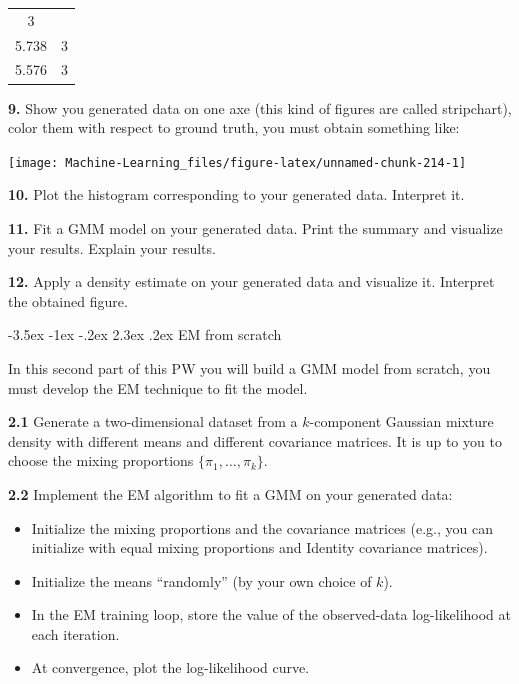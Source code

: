 \documentclass[]{book}
\makeatletter
\providecommand{\tightlist}{%
  \setlength{\itemsep}{0pt}\setlength{\parskip}{0pt}}
\renewcommand\section{\@startsection {section}{1}{\z@}%
                                   {-3.5ex \@plus -1ex \@minus -.2ex}%
                                   {2.3ex \@plus.2ex}%
                                   {\normalfont\Large\bfseries\color{ForestGreen}}}
\theoremstyle{definition}
\theoremstyle{definition}
\theoremstyle{definition}
\theoremstyle{remark}
\makeatother
\begin{document}
\begin{longtable}[]{@{}cc@{}}
\begin{minipage}[t]{0.13\columnwidth}
3\strut
\end{minipage}\tabularnewline
\begin{minipage}[t]{0.13\columnwidth}\centering\strut
5.738\strut
\end{minipage} & \begin{minipage}[t]{0.13\columnwidth}\centering\strut
3\strut
\end{minipage}\tabularnewline
\begin{minipage}[t]{0.13\columnwidth}\centering\strut
5.576\strut
\end{minipage} & \begin{minipage}[t]{0.13\columnwidth}\centering\strut
3\strut
\end{minipage}\tabularnewline
\bottomrule
\end{longtable}

\textbf{9.} Show you generated data on one axe (this kind of figures are
called stripchart), color them with respect to ground truth, you must
obtain something like:

\begin{center}\texttt{[image: Machine-Learning\_files/figure-latex/unnamed-chunk-214-1]} \end{center}

\textbf{10.} Plot the histogram corresponding to your generated data.
Interpret it.

\textbf{11.} Fit a GMM model on your generated data. Print the summary
and visualize your results. Explain your results.

\textbf{12.} Apply a density estimate on your generated data and
visualize it. Interpret the obtained figure.

\section{EM from scratch}\label{em-from-scratch}

In this second part of this PW you will build a GMM model from scratch,
you must develop the EM technique to fit the model.

\textbf{2.1} Generate a two-dimensional dataset from a \(k\)-component
Gaussian mixture density with different means and different covariance
matrices. It is up to you to choose the mixing proportions
\(\{\pi_1,\ldots,\pi_k\}\).

\textbf{2.2} Implement the EM algorithm to fit a GMM on your generated
data:

\begin{itemize}
\tightlist
\item
  Initialize the mixing proportions and the covariance matrices (e.g.,
  you can initialize with equal mixing proportions and Identity
  covariance matrices).
\item
  Initialize the means ``randomly'' (by your own choice of \(k\)).
\item
  In the EM training loop, store the value of the observed-data
  log-likelihood at each iteration.
\item
  At convergence, plot the log-likelihood curve.
\end{itemize}
\end{document}

